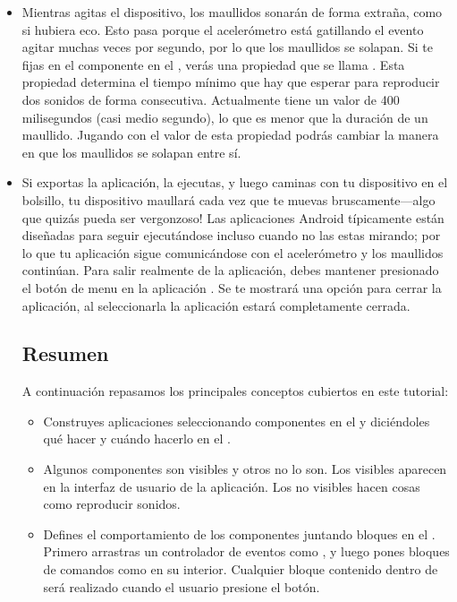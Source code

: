 \documentclass[letterpaper]{article}
\begin{document}
\begin{itemize}

\item Mientras agitas el dispositivo, los maullidos sonarán de forma
  extraña, como si hubiera eco. Esto pasa porque el acelerómetro está
  gatillando el evento agitar muchas veces por segundo, por lo que los
  maullidos se solapan. Si te fijas en el componente
   en el \designer, verás una propiedad que se llama
  . Esta propiedad determina el tiempo
  mínimo que hay que esperar para reproducir dos sonidos de forma
  consecutiva. Actualmente tiene un valor de 400 milisegundos (casi
  medio segundo), lo que es menor que la duración de un
  maullido. Jugando con el valor de esta propiedad podrás cambiar la
  manera en que los maullidos se solapan entre sí.

\item Si exportas la aplicación, la ejecutas, y luego caminas con tu
  dispositivo en el bolsillo, tu dispositivo maullará cada vez que te
  muevas bruscamente---algo que quizás pueda ser vergonzoso! Las
  aplicaciones Android típicamente están diseñadas para seguir
  ejecutándose incluso cuando no las estas mirando; por lo que tu
  aplicación sigue comunicándose con el acelerómetro y los maullidos
  continúan. Para salir realmente de la aplicación, debes mantener
  presionado el botón de menu en la aplicación . Se te mostrará una opción para cerrar la aplicación, al
  seleccionarla la aplicación estará completamente cerrada.

\subsection*{Resumen}

A continuación repasamos los principales conceptos cubiertos en este
tutorial:

\begin{itemize}

\item Construyes aplicaciones seleccionando componentes en el
  \designer y diciéndoles qué hacer y cuándo hacerlo en el \blockEditor.

\item Algunos componentes son visibles y otros no lo son. Los visibles
  aparecen en la interfaz de usuario de la aplicación. Los no visibles
  hacen cosas como reproducir sonidos.

\item Defines el comportamiento de los componentes juntando bloques en
  el \blockEditor. Primero arrastras un controlador de eventos como
  , y luego pones bloques de comandos como
   en su interior. Cualquier bloque
  contenido dentro de  será realizado cuando el
  usuario presione el botón.


\end{itemize}
\end{itemize}
\end{document}
